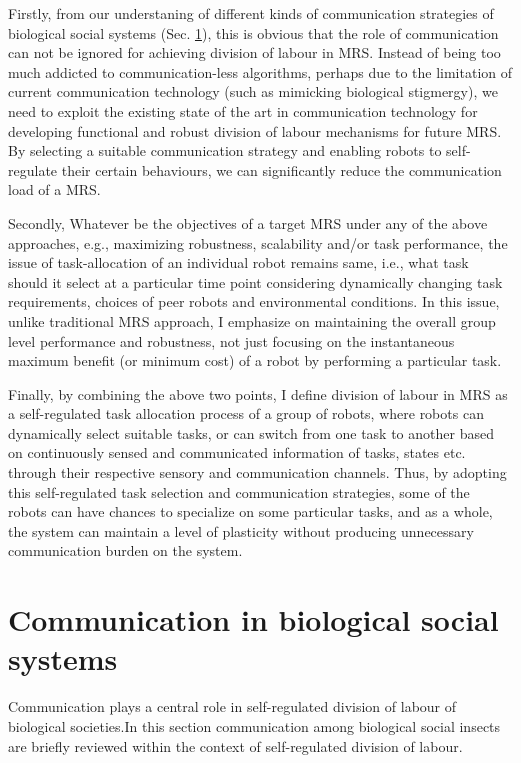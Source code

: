 Firstly, from our understaning of different kinds of communication strategies of biological social systems (Sec. \ref{bg:bio-comm}), this is obvious that the role of communication can not be ignored for achieving division of labour in MRS. Instead of being too much addicted to communication-less algorithms, perhaps due to the limitation of current communication  technology (such as mimicking biological stigmergy), we need to exploit the existing state of the art  in communication technology for developing functional and robust division of labour mechanisms for future MRS.  By selecting a suitable communication strategy and enabling robots to self-regulate their  certain behaviours,  we can significantly reduce the communication load of a MRS.

Secondly, Whatever be the objectives of a target MRS under any of the above approaches, e.g., maximizing robustness, scalability and/or task performance, the issue of task-allocation of an individual robot remains same, i.e., what task should it select at a particular time point considering dynamically changing task requirements, choices of peer robots and environmental conditions. In this issue, unlike traditional MRS approach, I emphasize on maintaining the overall group level performance and robustness, not just focusing on the instantaneous maximum benefit (or minimum cost) of a robot by performing a particular task.

Finally, by combining the above two points, I define division of labour in MRS as a self-regulated task allocation process of a group of robots, where  robots can dynamically select suitable tasks, or can switch from one task to another based on  continuously sensed  and communicated information of tasks, states etc. through their respective sensory and communication  channels. Thus, by adopting this self-regulated task selection and communication strategies, some of the robots can have chances to specialize on some particular tasks, and as a whole, the system can maintain a level of plasticity without producing unnecessary communication burden on the system.
\section{Communication in biological social systems}
\label{bg:bio-comm}
Communication plays a central role in self-regulated division of labour of biological societies.In this section communication among biological social insects are briefly reviewed within the context of self-regulated  division of labour.

